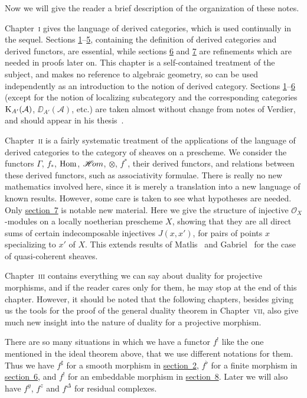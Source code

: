 \bigskip

Now we will give the reader a brief description of the organization of these notes.

Chapter~\textsc{i} gives the language of derived categories, which is used continually in the sequel. Sections \hyperref[sec:1.1]{1}--\hyperref[sec:1.5]{5}, containing the definition of derived categories and derived functors, are essential, while sections \hyperref[sec:1.6]{6} and \hyperref[sec:1.7]{7} are refinements which are needed in proofs later on. This chapter is a self-contained treatment of the subject, and makes no reference to algebraic geometry, so can be used independently as an introduction to the notion of derived category. Sections \hyperref[sec:1.1]{1}--\hyperref[sec:1.6]{6} (except for the notion of localizing subcategory and the corresponding categories $\operatorname{K}_{A'}(\mathcal{A})$, $\DD_{A'}(\mathcal{A})$, etc.) are taken almost without change from notes of Verdier, and should appear in his thesis~\cite{18}.


Chapter~\textsc{ii} is a fairly systematic treatment of the applications of the language of derived categories to the category of sheaves on a prescheme. We consider the functors $\Gamma$, $f_{*}$, $\operatorname{Hom}$, $\mathop{\mathscr{H}\!om}\nolimits$, $\otimes$, $f^{*}$, their derived functors, and relations between these derived functors, such as associativity formulae. There is really no new mathematics involved here, since it is merely a translation into a new language of known results. However, some care is taken to see what hypotheses are needed. Only \hyperref[sec:2.7]{section~7} is notable new material. Here we give the structure of injective $\mathcal{O}_{X}$-modules on a locally noetherian prescheme $X$, showing that they are all direct sums of certain indecomposable injectives $J(x,x')$, for pairs of points $x$ specializing to $x'$ of $X$. This extends results of Matlis~\cite{13} and Gabriel~\cite{5} for the case of quasi-coherent sheaves.

Chapter~\textsc{iii} contains everything we can say about duality for projective morphisms, and if the reader cares only for them, he may stop at the end of this chapter. However, it should be noted that the following chapters, besides giving us the tools for the proof of the general duality theorem in Chapter~\textsc{vii}, also give much new insight into the nature of duality for a projective morphism.

There are so many situations in which we have a functor $f^{!}$ like the one mentioned in the ideal theorem above, that we use different notations for them. Thus we have $f^{\sharp}$ for a smooth morphism in \hyperref[sec:3.2]{section~2}, $f^{\flat}$ for a finite morphism in \hyperref[sec:3.6]{section~6}, and $f^{!}$ for an embeddable morphism in \hyperref[sec:3.8]{section~8}. Later we will also have $f^{y}$, $f^{z}$  and $f^{\Delta}$  for residual complexes.

